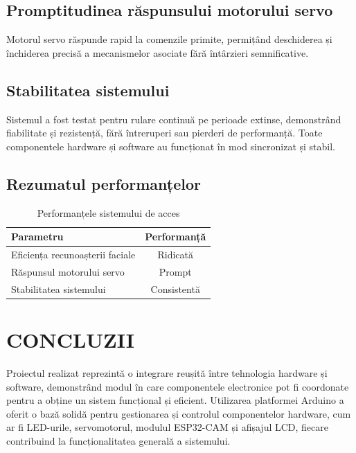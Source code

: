 \documentclass[a4paper,12pt]{report}
\begin{document}
\section{Promptitudinea răspunsului motorului servo}
Motorul servo răspunde rapid la comenzile primite, permițând deschiderea și închiderea precisă a mecanismelor asociate fără întârzieri semnificative.

\section{Stabilitatea sistemului}
Sistemul a fost testat pentru rulare continuă pe perioade extinse, demonstrând fiabilitate și rezistență, fără întreruperi sau pierderi de performanță. Toate componentele hardware și software au funcționat în mod sincronizat și stabil.

\section{Rezumatul performanțelor}


\begin{table}[H]
    \centering
    \begin{tabular}{|l|c|}
        \hline
        \textbf{Parametru} & \textbf{Performanță} \\ \hline
        Eficiența recunoașterii faciale & Ridicată \\ \hline
        Răspunsul motorului servo & Prompt \\ \hline
        Stabilitatea sistemului & Consistentă \\ \hline
    \end{tabular}
    \caption{Performanțele sistemului de acces}
    \label{tab:performante}
\end{table}


\chapter*{CONCLUZII}

Proiectul realizat reprezintă o integrare reușită între tehnologia hardware și software, demonstrând modul în care componentele electronice pot fi coordonate pentru a obține un sistem funcțional și eficient. Utilizarea platformei Arduino a oferit o bază solidă pentru gestionarea și controlul componentelor hardware, cum ar fi LED-urile, servomotorul, modulul ESP32-CAM și afișajul LCD, fiecare contribuind la funcționalitatea generală a sistemului.
\end{document}
